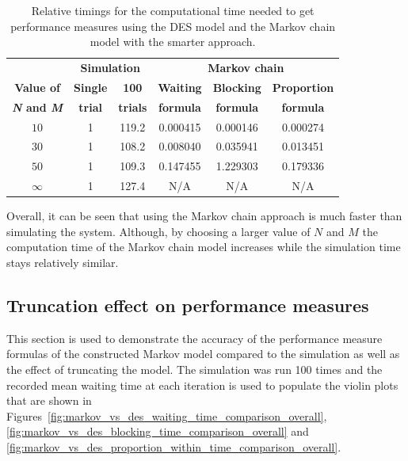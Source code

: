 \tiny
\begin{table}[H]
    \centering
    \caption{Relative timings for the computational time needed to get
    performance measures using the DES model and the Markov chain model with
    the smarter approach.}
    \begin{tabular}{c|cc|ccc}
        & \multicolumn{2}{c}{\textbf{Simulation}} &
        \multicolumn{3}{c}{\textbf{Markov chain}} \\
        \textbf{Value of} & \textbf{Single} & \textbf{100} &
        \textbf{Waiting} & \textbf{Blocking} &
        \textbf{Proportion} \\
        \textbf{\textit{N} and \textit{M}} & \textbf{trial} & \textbf{trials} &
        \textbf{formula} & \textbf{formula} & \textbf{formula} \\
        \hline
        \(10\) & 1 & 119.2 & 0.000415 & 0.000146 & 0.000274 \\
        \hline
        \(30\) & 1 & 108.2 & 0.008040 & 0.035941 & 0.013451 \\
        \hline
        \(50\) & 1 & 109.3 & 0.147455 & 1.229303 & 0.179336 \\
        \hline
        \(\infty\) & 1 & 127.4 & N/A & N/A & N/A \\
    \end{tabular}
    \label{tab:truncation_effect_timings_new}
\end{table}
\normalsize

Overall, it can be seen that using the Markov chain approach is much faster than
simulating the system.
Although, by choosing a larger value of \(N\) and \(M\) the computation time of
the Markov chain model increases while the simulation time stays relatively
similar.

\subsection{Truncation effect on performance measures}

This section is used to demonstrate the accuracy of the performance measure
formulas of the constructed Markov model compared to the simulation as well as
the effect of truncating the model.
The simulation was run 100 times and the recorded mean waiting time at each
iteration is used to populate the violin plots that are shown in
Figures~\ref{fig:markov_vs_des_waiting_time_comparison_overall},
\ref{fig:markov_vs_des_blocking_time_comparison_overall} and
\ref{fig:markov_vs_des_proportion_within_time_comparison_overall}.

